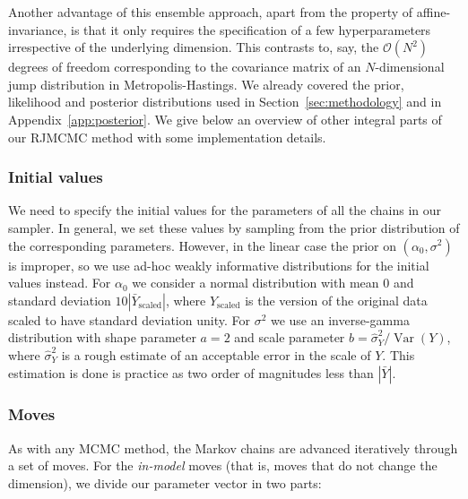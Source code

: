 Another advantage of this ensemble approach, apart from the property of affine-invariance, is that it only requires the specification of a few hyperparameters irrespective of the underlying dimension. This contrasts to, say, the \(\mathcal O(N^2)\) degrees of freedom corresponding to the covariance matrix of an \(N\)-dimensional jump distribution in Metropolis-Hastings. We already covered the prior, likelihood and posterior distributions used in Section~\ref{sec:methodology} and in Appendix~\ref{app:posterior}. We give below an overview of other integral parts of our RJMCMC method with some implementation details.

\subsubsection*{Initial values}

We need to specify the initial values for the parameters of all the chains in our sampler. In general, we set these values by sampling from the prior distribution of the corresponding parameters. However, in the linear case the prior on \((\alpha_0, \sigma^2)\) is improper, so we use ad-hoc weakly informative distributions for the initial values instead. For \(\alpha_0\) we consider a normal distribution with mean \(0\) and standard deviation \(10|\bar{Y}_{\text{scaled}}|\), where \(Y_{\text{scaled}}\) is the version of the original data scaled to have standard deviation unity. For \(\sigma^2\) we use an inverse-gamma distribution with shape parameter \(a=2\) and scale parameter \(b=\hat\sigma^2_Y/\operatorname{Var}(Y)\), where \(\hat \sigma^2_Y\) is a rough estimate of an acceptable error in the scale of \(Y\). This estimation is done is practice as two order of magnitudes less than \(|\bar{Y}|\).

\subsubsection*{Moves}

As with any MCMC method, the Markov chains are advanced iteratively through a set of moves. For the \textit{in-model} moves (that is, moves that do not change the dimension), we divide our parameter vector in two parts:

